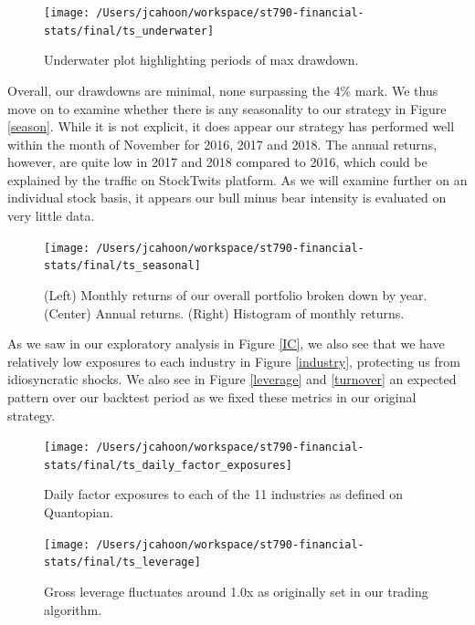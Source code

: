 \documentclass[11,]{article}
\begin{document}
\begin{figure}

{\centering \texttt{[image: /Users/jcahoon/workspace/st790-financial-stats/final/ts\_underwater]} 

}

\caption{\label{under}Underwater plot highlighting periods of max drawdown.}\label{fig:unnamed-chunk-7}
\end{figure}

Overall, our drawdowns are minimal, none surpassing the 4\% mark. We
thus move on to examine whether there is any seasonality to our strategy
in Figure \ref{season}. While it is not explicit, it does appear our
strategy has performed well within the month of November for 2016, 2017
and 2018. The annual returns, however, are quite low in 2017 and 2018
compared to 2016, which could be explained by the traffic on StockTwits
platform. As we will examine further on an individual stock basis, it
appears our bull minus bear intensity is evaluated on very little data.

\begin{figure}

{\centering \texttt{[image: /Users/jcahoon/workspace/st790-financial-stats/final/ts\_seasonal]} 

}

\caption{\label{season}(Left) Monthly returns of our overall portfolio broken down by year. (Center) Annual returns. (Right) Histogram of monthly returns.}\label{fig:unnamed-chunk-8}
\end{figure}

As we saw in our exploratory analysis in Figure \ref{IC}, we also see
that we have relatively low exposures to each industry in Figure
\ref{industry}, protecting us from idiosyncratic shocks. We also see in
Figure \ref{leverage} and \ref{turnover} an expected pattern over our
backtest period as we fixed these metrics in our original strategy.

\begin{figure}

{\centering \texttt{[image: /Users/jcahoon/workspace/st790-financial-stats/final/ts\_daily\_factor\_exposures]} 

}

\caption{\label{industry}Daily factor exposures to each of the 11 industries as defined on Quantopian.}\label{fig:unnamed-chunk-9}
\end{figure}

\begin{figure}

{\centering \texttt{[image: /Users/jcahoon/workspace/st790-financial-stats/final/ts\_leverage]} 

}

\caption{\label{leverage}Gross leverage fluctuates around 1.0x as originally set in our trading algorithm.}\label{fig:unnamed-chunk-10}
\end{figure}
\end{document}
